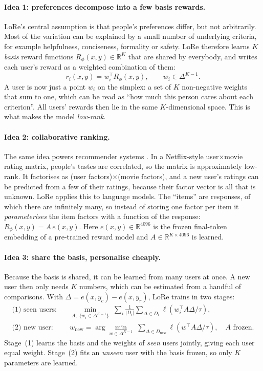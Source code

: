 \documentclass[11pt,a4paper]{article}
\newcommand{\R}{\mathbb{R}}
\newcommand{\simplex}{\Delta^{K-1}}
\begin{document}
\paragraph{Idea 1: preferences decompose into a few basis rewards.} LoRe's central assumption is
that people's preferences differ, but not arbitrarily. Most of the variation can be explained by a
small number of underlying criteria, for example helpfulness, conciseness, formality or safety. LoRe
therefore learns $K$ \emph{basis} reward functions $R_\phi(x,y)\in\R^K$ that are shared by everybody, and
writes each user's reward as a weighted combination of them:
\[
r_i(x,y)=w_i^\top R_\phi(x,y),\qquad w_i\in\simplex .
\]
A user is now just a point $w_i$ on the simplex: a set of $K$ non-negative weights that sum to one,
which can be read as ``how much this person cares about each criterion''. All users' rewards then
lie in the same $K$-dimensional space. This is what makes the model \emph{low-rank}.

\paragraph{Idea 2: collaborative ranking.} The same idea powers recommender systems
\citep{koren2009matrix,park2015preference}. In a Netflix-style user$\times$movie rating matrix,
people's tastes are correlated, so the matrix is approximately low-rank. It factorises as
(user factors)$\times$(movie factors), and a new user's ratings can be predicted from a few of their
ratings, because their factor vector is all that is unknown. LoRe applies this to language models. The
``items'' are responses, of which there are infinitely many, so instead of storing one factor per item
it \emph{parameterises} the item factors with a function of the response: $R_\phi(x,y)=A\,e(x,y)$. Here
$e(x,y)\in\R^{4096}$ is the frozen final-token embedding of a pre-trained reward model and
$A\in\R^{K\times4096}$ is learned.

\paragraph{Idea 3: share the basis, personalise cheaply.} Because the basis is shared, it can be
learned from many users at once. A new user then only needs $K$ numbers, which can be estimated from a
handful of comparisons. With $\Delta=e(x,y_c)-e(x,y_r)$, LoRe trains in two stages:
\begin{align}
\text{(1) seen users:}\quad &\min_{A,\;\{w_i\in\simplex\}}\;
\sum_{i}\frac{1}{|D_i|}\sum_{\Delta\in D_i}\ell\!\left(w_i^\top A\Delta/\tau\right),
\label{eq:joint}\\
\text{(2) new user:}\quad &w_\text{new}=\arg\min_{w\in\simplex}\;\sum_{\Delta\in D_\text{new}}\ell\!\left(w^\top A\Delta/\tau\right),\quad A\text{ frozen.}
\label{eq:fewshot}
\end{align}
Stage~(1) learns the basis and the weights of \emph{seen} users jointly, giving each user equal weight.
Stage~(2) fits an \emph{unseen} user with the basis frozen, so only $K$ parameters are learned.
\end{document}
